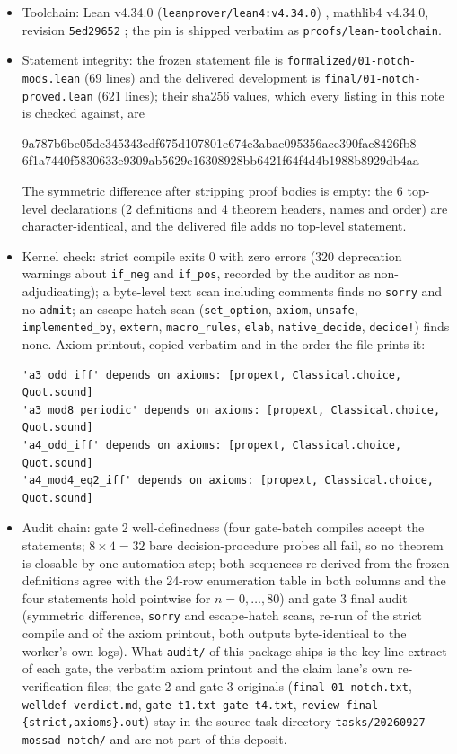 \documentclass[11pt]{article}
\begin{document}
\begin{itemize}
\item Toolchain: Lean v4.34.0 (\texttt{leanprover/lean4:v4.34.0}) \cite{lean4},
mathlib4 v4.34.0, revision \texttt{5ed29652} \cite{mathlib}; the pin is shipped
verbatim as \texttt{proofs/lean-toolchain}.
\item Statement integrity: the frozen statement file is
\texttt{formalized/}\allowbreak\texttt{01-notch-mods.lean} (69 lines) and the
delivered development is \texttt{final/}\allowbreak\texttt{01-notch-proved.lean}
(621 lines); their sha256 values, which every listing in this note is checked
against, are
\begin{center}\footnotesize\ttfamily
9a787b6be05dc345343edf675d107801e674e3abae095356ace390fac8426fb8 \\
6f1a7440f5830633e9309ab5629e16308928bb6421f64f4d4b1988b8929db4aa
\end{center}
The symmetric difference after stripping proof bodies is empty: the 6 top-level
declarations (2 definitions and 4 theorem headers, names and order) are
character-identical, and the delivered file adds no top-level statement.
\item Kernel check: strict compile exits 0 with zero errors (320 deprecation
warnings about \texttt{if\_neg} and \texttt{if\_pos}, recorded by the auditor as
non-adjudicating); a byte-level text scan including comments finds no
\texttt{sorry} and no \texttt{admit}; an escape-hatch scan (\texttt{set\_option},
\texttt{axiom}, \texttt{unsafe}, \texttt{implemented\_by}, \texttt{extern},
\texttt{macro\_rules}, \texttt{elab}, \texttt{native\_decide}, \texttt{decide!})
finds none. Axiom printout, copied verbatim and in the order the file prints it:

{\scriptsize
\begin{verbatim}
'a3_odd_iff' depends on axioms: [propext, Classical.choice, Quot.sound]
'a3_mod8_periodic' depends on axioms: [propext, Classical.choice, Quot.sound]
'a4_odd_iff' depends on axioms: [propext, Classical.choice, Quot.sound]
'a4_mod4_eq2_iff' depends on axioms: [propext, Classical.choice, Quot.sound]
\end{verbatim}
}
\item Audit chain: gate 2 well-definedness (four gate-batch compiles accept the
statements; $8 \times 4 = 32$ bare decision-procedure probes all fail, so no
theorem is closable by one automation step; both sequences re-derived from the
frozen definitions agree with the 24-row enumeration table in both columns and
the four statements hold pointwise for $n = 0, \dots, 80$) and gate 3 final audit
(symmetric difference, \texttt{sorry} and escape-hatch scans, re-run of the
strict compile and of the axiom printout, both outputs byte-identical to the
worker's own logs).
What \texttt{audit/} of this package ships is the key-line extract of each gate,
the verbatim axiom printout and the claim lane's own re-verification files; the
gate 2 and gate 3 originals (\texttt{final-01-notch.txt},
\texttt{welldef-verdict.md}, \texttt{gate-t1.txt}--\texttt{gate-t4.txt},
\texttt{review-final-\{strict,axioms\}.out}) stay in the source task directory
\texttt{tasks/20260927-mossad-notch/} and are not part of this deposit.
\end{itemize}
\end{document}
